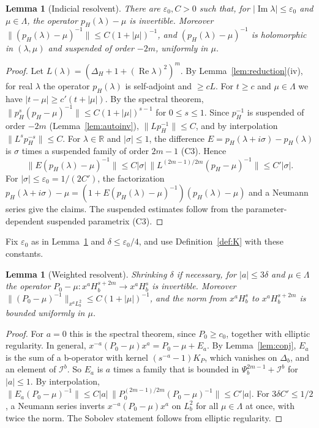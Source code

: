 \documentclass[11pt,oneside,reqno]{article}
\newcommand{\Ib}{\mathcal I^b}
\theoremstyle{plain}
\newtheorem{lemma}[theorem]{Lemma}
\theoremstyle{definition}
\theoremstyle{remark}
\begin{document}
\begin{lemma}[Indicial resolvent]\label{lem:indres}
There are \(\varepsilon_0,C>0\) such that, for
\(|\operatorname{Im}\lambda|\leq\varepsilon_0\) and \(\mu\in\Lambda\), the
operator \(p_H(\lambda)-\mu\) is invertible. Moreover
\(\|(p_H(\lambda)-\mu)^{-1}\|\leq C(1+|\mu|)^{-1}\), and
\((p_H(\lambda)-\mu)^{-1}\) is holomorphic in \((\lambda,\mu)\) and
suspended of order \(-2m\), uniformly in \(\mu\).
\end{lemma}

\begin{proof}
Let \(L(\lambda)=(\Delta_H+1+(\operatorname{Re}\lambda)^2)^m\). By
Lemma~\ref{lem:reduction}(iv), for real \(\lambda\) the operator
\(p_H(\lambda)\) is self-adjoint and \(\geq cL\). For \(t\geq c\) and \(\mu\in\Lambda\) we have
\(|t-\mu|\geq c'(t+|\mu|)\). By the spectral theorem,
\(\|p_H^{s}(p_H-\mu)^{-1}\|\leq C(1+|\mu|)^{s-1}\) for \(0\leq s\leq1\). Since
\(p_H^{-1}\) is suspended of order \(-2m\) (Lemma~\ref{lem:autoinv}),
\(\|Lp_H^{-1}\|\leq C\), and by interpolation \(\|L^sp_H^{-s}\|\leq C\).
For \(\lambda\in\mathbb R\) and \(|\sigma|\leq1\), the difference
\(E=p_H(\lambda+i\sigma)-p_H(\lambda)\) is \(\sigma\) times a suspended
family of order \(2m-1\) (C3). Hence
\[
 \|E(p_H(\lambda)-\mu)^{-1}\|\leq C|\sigma|\,\|L^{(2m-1)/2m}(p_H-\mu)^{-1}\|
 \leq C'|\sigma| .
\] For \(|\sigma|\leq\varepsilon_0=1/(2C')\), the factorization
\(p_H(\lambda+i\sigma)-\mu=(1+E(p_H(\lambda)-\mu)^{-1})(p_H(\lambda)-\mu)\)
and a Neumann series give the claims. The suspended estimates follow from
the parameter-dependent suspended parametrix (C3).
\end{proof}

Fix \(\varepsilon_0\) as in Lemma~\ref{lem:indres} and
\(\delta\leq\varepsilon_0/4\), and use Definition~\ref{def:K} with these
constants.

\begin{lemma}[Weighted resolvent]\label{lem:weightedres}
Shrinking \(\delta\) if necessary, for \(|a|\leq3\delta\) and
\(\mu\in\Lambda\) the operator
\(P_0-\mu:x^aH^{s+2m}_b\to x^aH^s_b\) is invertible. Moreover
\(\|(P_0-\mu)^{-1}\|_{x^aL^2_b}\leq C(1+|\mu|)^{-1}\), and the norm from
\(x^aH^s_b\) to \(x^aH^{s+2m}_b\) is bounded uniformly in \(\mu\).
\end{lemma}

\begin{proof}
For \(a=0\) this is the spectral theorem, since \(P_0\geq c_0\), together
with elliptic regularity. In general, \(x^{-a}(P_0-\mu)x^a=P_0-\mu+E_a\). By
Lemma~\ref{lem:conj}, \(E_a\) is the sum of a b-operator with kernel
\((s^{-a}-1)K_P\), which vanishes on \(\Delta_b\), and an element of \(\Ib\).
So \(E_a\) is \(a\) times a family that is bounded in \(\Psi_b^{2m-1}+\Ib\)
for \(|a|\leq1\). By interpolation,
\(\|E_a(P_0-\mu)^{-1}\|\leq C|a|\,\|P_0^{(2m-1)/2m}(P_0-\mu)^{-1}\|
\leq C'|a|\). For \(3\delta C'\leq1/2\), a Neumann series inverts
\(x^{-a}(P_0-\mu)x^a\) on \(L^2_b\) for all \(\mu\in\Lambda\) at once, with
twice the norm. The Sobolev statement follows from elliptic regularity.
\end{proof}
\end{document}
